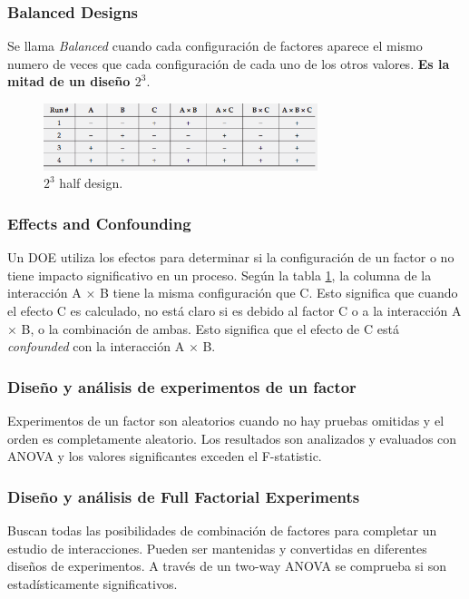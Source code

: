 \documentclass[]{article}
\begin{document}
\subsubsection{Balanced Designs}
Se llama \textit{Balanced} cuando cada configuración de factores aparece el mismo numero de veces que cada configuración de cada uno de los otros valores. \textbf{Es la mitad de un diseño $2^3$}.

\begin{figure}[H]
	\centering
	\includegraphics[width=80mm]{imagenes/a23halfdesign.png}
	\caption{$2^3$ half design.}
	\label{fig:a23halfdesign}
\end{figure}

\subsubsection{Effects and Confounding}

Un DOE utiliza los efectos para determinar si la configuración de un factor o no tiene impacto significativo en un proceso. 
Según la tabla \ref{fig:a23halfdesign}, la columna de la interacción A $\times$ B tiene la misma configuración que C. Esto significa que cuando el efecto C es calculado, no está claro si es debido al factor C o a la interacción A $\times$ B, o la combinación de ambas. Esto significa que el efecto de C está \textit{confounded} con la interacción A $\times$ B.

\subsubsection{Diseño y análisis de experimentos de un factor}
Experimentos de un factor son aleatorios cuando no hay pruebas omitidas y el orden es completamente aleatorio. Los resultados son analizados y evaluados con ANOVA y los valores significantes exceden el F-statistic.
\subsubsection{Diseño y análisis de Full Factorial Experiments}
Buscan todas las posibilidades de combinación de factores para completar un estudio de interacciones. Pueden ser mantenidas y convertidas en diferentes diseños de experimentos. A través de un two-way ANOVA se comprueba si son estadísticamente significativos.
\end{document}
